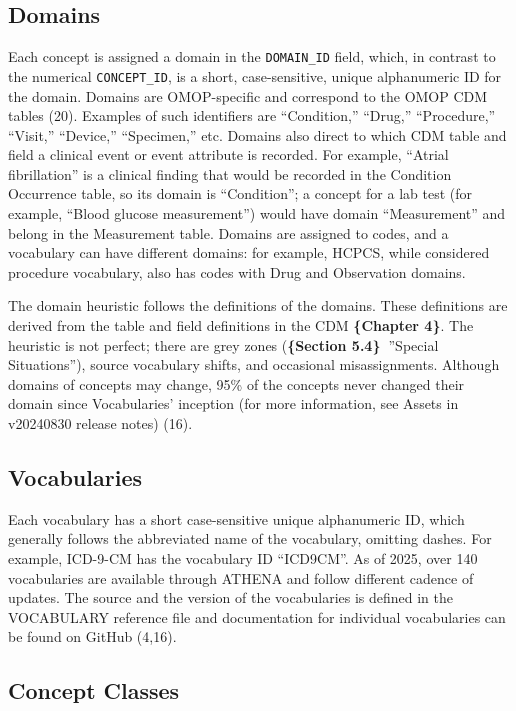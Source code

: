 \documentclass[
  letterpaper,
  paper=7in:10in,
  pagesize=pdftex,
  headinclude=on,
  footinclude=on,
  12pt]{scrbook}
\begin{document}
\subsection{Domains}\label{domains}

Each concept is assigned a domain in the \texttt{DOMAIN\_ID} field,
which, in contrast to the numerical \texttt{CONCEPT\_ID}, is a short,
case-sensitive, unique alphanumeric ID for the domain. Domains are
OMOP-specific and correspond to the OMOP CDM tables (20). Examples of
such identifiers are ``Condition,'' ``Drug,'' ``Procedure,'' ``Visit,''
``Device,'' ``Specimen,'' etc. Domains also direct to which CDM table
and field a clinical event or event attribute is recorded. For example,
``Atrial fibrillation'' is a clinical finding that would be recorded in
the Condition Occurrence table, so its domain is ``Condition''; a
concept for a lab test (for example, ``Blood glucose measurement'')
would have domain ``Measurement'' and belong in the Measurement table.
Domains are assigned to codes, and a vocabulary can have different
domains: for example, HCPCS, while considered procedure vocabulary, also
has codes with Drug and Observation domains.

The domain heuristic follows the definitions of the domains. These
definitions are derived from the table and field definitions in the CDM
\textbf{\{Chapter 4\}}. The heuristic is not perfect; there are grey
zones (\textbf{\{Section 5.4\}~}''Special Situations''), source
vocabulary shifts, and occasional misassignments. Although domains of
concepts may change, 95\% of the concepts never changed their domain
since Vocabularies' inception (for more information, see Assets in
v20240830 release notes) (16).

\subsection{Vocabularies}\label{vocabularies}

Each vocabulary has a short case-sensitive unique alphanumeric ID, which
generally follows the abbreviated name of the vocabulary, omitting
dashes. For example, ICD-9-CM has the vocabulary ID ``ICD9CM''. As of
2025, over 140 vocabularies are available through ATHENA and follow
different cadence of updates. The source and the version of the
vocabularies is defined in the VOCABULARY reference file and
documentation for individual vocabularies can be found on GitHub (4,16).

\subsection{Concept Classes}\label{concept-classes}
\end{document}
